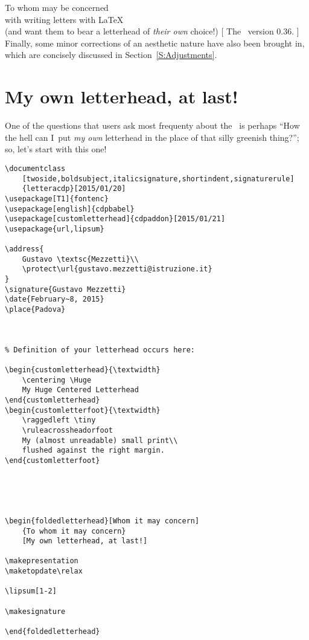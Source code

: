 \begin{letterhead}{
	To whom may be concerned\\
	with writing letters with \LaTeX\\
	(and want them to bear a letterhead
	of \emph{their own} choice!)
}[
	The \Bundle\ version 0.36.
]
Finally, some minor corrections of an aesthetic nature have also been brought
in, which are concisely discussed in Section~\ref{S:Adjustments}.



\setcounter{secnumdepth}{2}

\section{My own letterhead, at last!}
\label{S:Letterhead}

One of the questions that users ask most frequenty about the \Bundle\ is perhaps
``How the hell can I~put \emph{my own} letterhead in the place of that silly
greenish thing?''; so, let's start with this one!

\begin{listing}[p]
	\cleantop
\begin{verbatim}
\documentclass
    [twoside,boldsubject,italicsignature,shortindent,signaturerule]
    {letteracdp}[2015/01/20]
\usepackage[T1]{fontenc}
\usepackage[english]{cdpbabel}
\usepackage[customletterhead]{cdpaddon}[2015/01/21]
\usepackage{url,lipsum}

\address{
    Gustavo \textsc{Mezzetti}\\
    \protect\url{gustavo.mezzetti@istruzione.it}
}
\signature{Gustavo Mezzetti}
\date{February~8, 2015}
\place{Padova}



% Definition of your letterhead occurs here:

\begin{customletterhead}{\textwidth}
    \centering \Huge
    My Huge Centered Letterhead
\end{customletterhead}
\begin{customletterfoot}{\textwidth}
    \raggedleft \tiny
    \ruleacrossheadorfoot
    My (almost unreadable) small print\\
    flushed against the right margin.
\end{customletterfoot}





\begin{foldedletterhead}[Whom it may concern]
    {To whom it may concern}
    [My own letterhead, at last!]

\makepresentation
\maketopdate\relax

\lipsum[1-2]

\makesignature

\end{foldedletterhead}



\end{verbatim}
\end{listing}
\end{letterhead}
